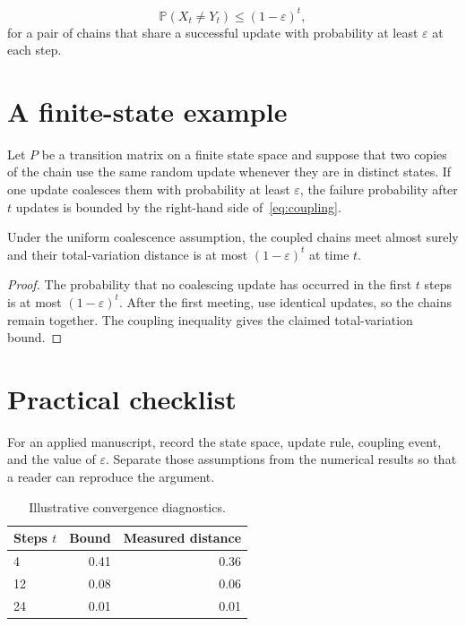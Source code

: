 \documentclass[EJP,preprint]{ejpecp}
\begin{document}
\begin{equation}
  \mathbb{P}(X_t\ne Y_t)\leq (1-\varepsilon)^t,
  \label{eq:coupling}
\end{equation}
for a pair of chains that share a successful update with probability at least
$\varepsilon$ at each step.

\section{A finite-state example}
Let $P$ be a transition matrix on a finite state space and suppose that two
copies of the chain use the same random update whenever they are in distinct
states. If one update coalesces them with probability at least
$\varepsilon$, the failure probability after $t$ updates is bounded by the
right-hand side of~\eqref{eq:coupling}.

\begin{theorem}
Under the uniform coalescence assumption, the coupled chains meet almost
surely and their total-variation distance is at most
$(1-\varepsilon)^t$ at time $t$.
\end{theorem}

\begin{proof}
The probability that no coalescing update has occurred in the first $t$
steps is at most $(1-\varepsilon)^t$. After the first meeting, use identical
updates, so the chains remain together. The coupling inequality gives the
claimed total-variation bound.
\end{proof}

\section{Practical checklist}
For an applied manuscript, record the state space, update rule, coupling
event, and the value of $\varepsilon$. Separate those assumptions from the
numerical results so that a reader can reproduce the argument.

\begin{table}[ht]
  \centering
  \caption{Illustrative convergence diagnostics.}
  \begin{tabular}{lrr}
    \hline
    Steps $t$ & Bound & Measured distance \\
    \hline
    4  & 0.41 & 0.36 \\
    12 & 0.08 & 0.06 \\
    24 & 0.01 & 0.01 \\
    \hline
  \end{tabular}
\end{table}
\end{document}
